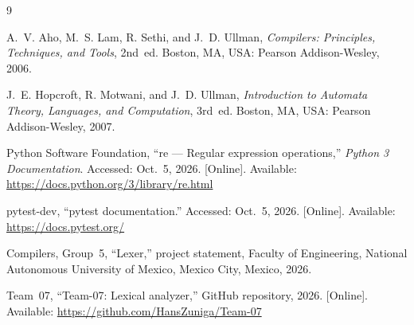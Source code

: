 \documentclass[11pt,letterpaper]{article}
\begin{document}
\newpage
\begin{thebibliography}{9}

A.~V. Aho, M.~S. Lam, R. Sethi, and J.~D. Ullman, \emph{Compilers:
Principles, Techniques, and Tools}, 2nd~ed. Boston, MA, USA: Pearson
Addison-Wesley, 2006.

J.~E. Hopcroft, R. Motwani, and J.~D. Ullman, \emph{Introduction to Automata
Theory, Languages, and Computation}, 3rd~ed. Boston, MA, USA: Pearson
Addison-Wesley, 2007.

Python Software Foundation, ``re --- Regular expression operations,''
\emph{Python 3 Documentation}. Accessed: Oct.~5, 2026. [Online].
Available: \url{https://docs.python.org/3/library/re.html}

pytest-dev, ``pytest documentation.'' Accessed: Oct.~5, 2026. [Online].
Available: \url{https://docs.pytest.org/}

Compilers, Group~5, ``Lexer,'' project statement, Faculty of Engineering,
National Autonomous University of Mexico, Mexico City, Mexico, 2026.

Team~07, ``Team-07: Lexical analyzer,'' GitHub repository, 2026. [Online].
Available: \url{https://github.com/HansZuniga/Team-07}

\end{thebibliography}
\end{document}

